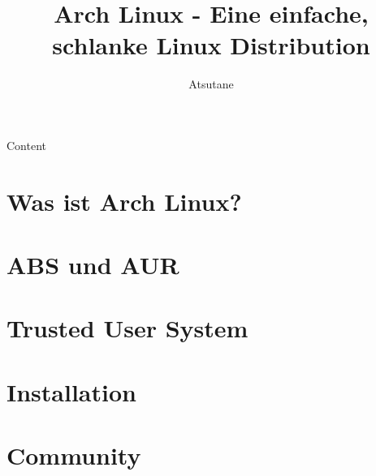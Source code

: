 \documentclass[mode=print,paper=screen,size=10pt,style=horatio]{powerdot}
\author{Atsutane}
\title{Arch Linux - Eine einfache, schlanke Linux Distribution}
\begin{document}
\maketitle
\begin{slide}{Content}
  \tableofcontents[content=sections]
\end{slide}



\section{Was ist Arch Linux?}


\section{ABS und AUR}


\section{Trusted User System}


\section{Installation}


\section{Community}
\end{document}
